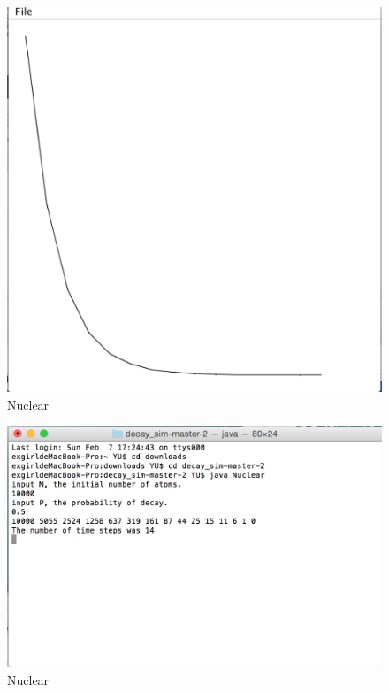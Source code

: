 \documentclass{article}
\begin{document}
\begin{figure}[h!]
\centering
\includegraphics{2.png}
\caption{Nuclear}
\label{fig:nuclear}
\end{figure}


\begin{figure}[h!]
\centering
\includegraphics{4.png}
\caption{Nuclear}
\label{fig:nuclear}
\end{figure}
\end{document}
